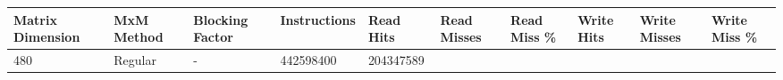 \documentclass[11pt]{article}
\begin{document}
\begin{longtable}[]{@{}llllllllll@{}}
\toprule
\begin{minipage}[b]{0.09\columnwidth}\raggedright\strut
Matrix Dimension\strut
\end{minipage} & \begin{minipage}[b]{0.06\columnwidth}\raggedright\strut
MxM Method\strut
\end{minipage} & \begin{minipage}[b]{0.09\columnwidth}\raggedright\strut
Blocking Factor\strut
\end{minipage} & \begin{minipage}[b]{0.07\columnwidth}\raggedright\strut
Instructions\strut
\end{minipage} & \begin{minipage}[b]{0.06\columnwidth}\raggedright\strut
Read Hits\strut
\end{minipage} & \begin{minipage}[b]{0.07\columnwidth}\raggedright\strut
Read Misses\strut
\end{minipage} & \begin{minipage}[b]{0.07\columnwidth}\raggedright\strut
Read Miss \%\strut
\end{minipage} & \begin{minipage}[b]{0.06\columnwidth}\raggedright\strut
Write Hits\strut
\end{minipage} & \begin{minipage}[b]{0.07\columnwidth}\raggedright\strut
Write Misses\strut
\end{minipage} & \begin{minipage}[b]{0.07\columnwidth}\raggedright\strut
Write Miss \%\strut
\end{minipage}\tabularnewline
\midrule
\endhead
\begin{minipage}[t]{0.09\columnwidth}\raggedright\strut
480\strut
\end{minipage} & \begin{minipage}[t]{0.06\columnwidth}\raggedright\strut
Regular\strut
\end{minipage} & \begin{minipage}[t]{0.09\columnwidth}\raggedright\strut
-\strut
\end{minipage} & \begin{minipage}[t]{0.07\columnwidth}\raggedright\strut
442598400\strut
\end{minipage} & \begin{minipage}[t]{0.06\columnwidth}\raggedright\strut
204347589\strut

\end{minipage}
\end{longtable}
\end{document}
